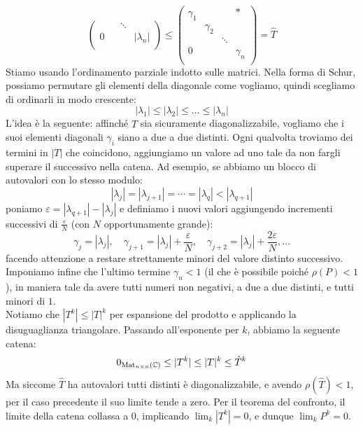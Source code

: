 \documentclass[a4paper]{article}
\begin{document}
\begin{snippetproof}{}
\begin{iffproof}
\begin{enumerate}
\[\begin{pmatrix}
                        &  & \ddots &  \\
                        0 &  &  & |\lambda_n| \\
                    \end{pmatrix} \leq
                    \begin{pmatrix}
                        \gamma_1 &  &  & \ast \\
                        & \gamma_2 &  &  \\
                        &  & \ddots &  \\
                        0 &  &  & \gamma_n \\
                    \end{pmatrix} = \hat T
                \]
                Stiamo usando l'ordinamento parziale indotto sulle matrici.
                Nella forma di Schur, possiamo permutare gli elementi della diagonale come vogliamo,
                quindi scegliamo di ordinarli in modo crescente:
                \[
                    |\lambda_1| \leq |\lambda_2| \leq \dots \leq |\lambda_n|
                \]
                L'idea è la seguente: affinché \(\hat T\) sia sicuramente diagonalizzabile, vogliamo che i suoi elementi diagonali \(\gamma_i\) siano a due a due distinti.
                Ogni qualvolta troviamo dei termini in \(|T|\) che coincidono, aggiungiamo un valore ad uno tale da non fargli superare il successivo nella catena.
                Ad esempio, se abbiamo un blocco di autovalori con lo stesso modulo:
                \[
                    |\lambda_j| = |\lambda_{j+1}| = \cdots = |\lambda_q| < |\lambda_{q+1}|
                \]
                poniamo \(\varepsilon = |\lambda_{q+1}| - |\lambda_j|\) e definiamo i nuovi valori aggiungendo incrementi successivi di \(\frac{\varepsilon}{N}\) (con \(N\) opportunamente grande):
                \[
                    \gamma_j = |\lambda_j|, \quad \gamma_{j+1} = |\lambda_j| + \frac{\varepsilon}{N}, \quad \gamma_{j+2} = |\lambda_j| + \frac{2\varepsilon}{N}, \dots
                \]
                facendo attenzione a restare strettamente minori del valore distinto successivo.
                Imponiamo infine che l'ultimo termine \(\gamma_n < 1\) (il che è possibile poiché \(\rho(P) < 1\)), in maniera tale da avere tutti numeri non negativi, a due a due distinti, e tutti minori di \(1\).\\
                Notiamo che \(|T^k| \leq |T|^k\) per espansione del prodotto e applicando la disuguaglianza triangolare.
                Passando all'esponente per \(k\), abbiamo la seguente catena:
                \[
                    0_{\operatorname{Mat}_{n \times n}(\mathbb{C})} \leq |T^k| \leq |T|^k \leq \hat T^k
                \]
                Ma siccome \(\hat T\) ha autovalori tutti distinti è diagonalizzabile, e avendo \(\rho(\hat T) < 1\), per il caso precedente il suo limite tende a zero.
                Per il teorema del confronto, il limite della catena collassa a \(0\), implicando \(\lim_k |T^k| = 0\), e dunque \(\lim_k P^k = 0\).
        \end{enumerate}
    \end{iffproof}
\end{snippetproof}
\end{document}
